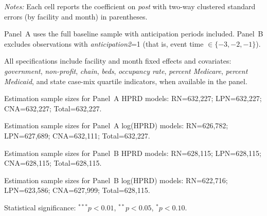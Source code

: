 \documentclass[11pt]{article}
\begin{document}
\begin{table}[!ht]
\begin{threeparttable}
\begin{tablenotes}[flushleft]
\footnotesize
\item \textit{Notes:} Each cell reports the coefficient on \textit{post} with two-way clustered standard errors (by facility and month) in parentheses.
\item Panel~A uses the full baseline sample with anticipation periods included. Panel~B excludes observations with \textit{anticipation2}=1 (that is, event time $\in \{-3,-2,-1\}$).
\item All specifications include facility and month fixed effects and covariates: \textit{government}, \textit{non-profit}, \textit{chain}, \textit{beds}, \textit{occupancy rate}, \textit{percent Medicare}, \textit{percent Medicaid}, and state case-mix quartile indicators, when available in the panel.
\item Estimation sample sizes for Panel~A HPRD models: RN=632,227; LPN=632,227; CNA=632,227; Total=632,227.
\item Estimation sample sizes for Panel~A log(HPRD) models: RN=626,782; LPN=627,689; CNA=632,111; Total=632,227.
\item Estimation sample sizes for Panel~B HPRD models: RN=628,115; LPN=628,115; CNA=628,115; Total=628,115.
\item Estimation sample sizes for Panel~B log(HPRD) models: RN=622,716; LPN=623,586; CNA=627,999; Total=628,115.
\item Statistical significance: $^{***}p<0.01$, $^{**}p<0.05$, $^{*}p<0.10$.
\end{tablenotes}
\end{threeparttable}
\end{table}
\endgroup
\end{document}
